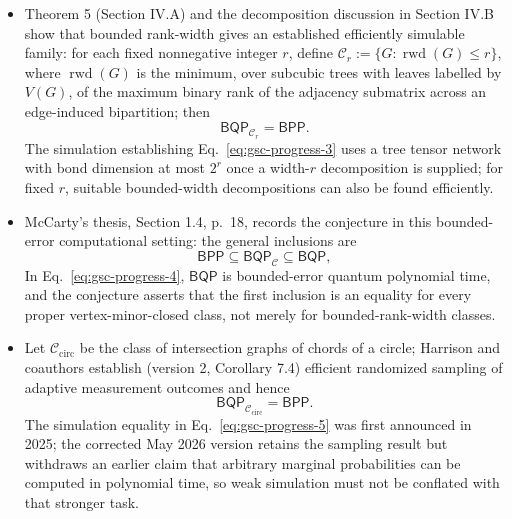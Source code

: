 \begin{itemize}
  \item Theorem 5 (Section IV.A) and the decomposition discussion in Section IV.B show that bounded rank-width gives an established efficiently simulable family: for each fixed nonnegative integer $r$, define $\mathcal C_r:=\{G:\operatorname{rwd}(G)\leq r\}$, where $\operatorname{rwd}(G)$ is the minimum, over subcubic trees with leaves labelled by $V(G)$, of the maximum binary rank of the adjacency submatrix across an edge-induced bipartition; then
  \begin{equation}
\mathsf{BQP}_{\mathcal C_r}=\mathsf{BPP}.
\label{eq:gsc-progress-3}
\end{equation}
  The simulation establishing Eq.~\eqref{eq:gsc-progress-3} uses a tree tensor network with bond dimension at most $2^r$ once a width-$r$ decomposition is supplied; for fixed $r$, suitable bounded-width decompositions can also be found efficiently. 

  \item McCarty's thesis, Section 1.4, p.~18, records the conjecture in this bounded-error computational setting: the general inclusions are
  \begin{equation}
\mathsf{BPP}\subseteq\mathsf{BQP}_{\mathcal C}\subseteq\mathsf{BQP},
\label{eq:gsc-progress-4}
\end{equation}
  In Eq.~\eqref{eq:gsc-progress-4}, $\mathsf{BQP}$ is bounded-error quantum polynomial time, and the conjecture asserts that the first inclusion is an equality for every proper vertex-minor-closed class, not merely for bounded-rank-width classes. 

  \item Let $\mathcal C_{\mathrm{circ}}$ be the class of intersection graphs of chords of a circle; Harrison and coauthors establish (version 2, Corollary 7.4) efficient randomized sampling of adaptive measurement outcomes and hence
  \begin{equation}
\mathsf{BQP}_{\mathcal C_{\mathrm{circ}}}=\mathsf{BPP}.
\label{eq:gsc-progress-5}
\end{equation}
  The simulation equality in Eq.~\eqref{eq:gsc-progress-5} was first announced in 2025; the corrected May 2026 version retains the sampling result but withdraws an earlier claim that arbitrary marginal probabilities can be computed in polynomial time, so weak simulation must not be conflated with that stronger task. 


\end{itemize}

